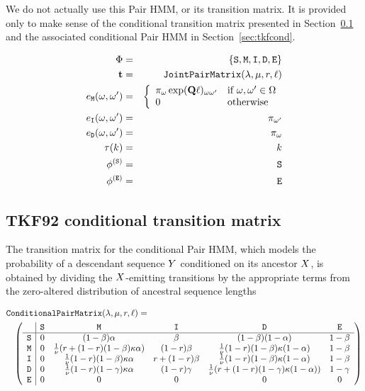 \documentclass{article}
\newcommand\seclabel[1]{\label{sec:#1}}
\newcommand\secref[1]{Section~\ref{sec:#1}}
\begin{document}
We do not actually use this Pair HMM, or its transition matrix.
It is provided only to make sense of the conditional transition matrix presented in
\secref{tkfcondmatrix} and the associated conditional Pair HMM in \secref{tkfcond}.

\begin{eqnarray*}
   \Phi & = & \{ {\tt S}, {\tt M}, {\tt I}, {\tt D}, {\tt E} \} \\
   {\bf t} & = & {\tt JointPairMatrix}(\lambda,\mu,r,\ell) \\
   e_{\tt M}(\omega,\omega') & = &
   \left\{
   \begin{array}{ll}
   \pi_{\omega} \exp({\bf Q} \ell)_{\omega \omega'} & \mbox{if $\omega,\omega' \in \Omega$}
   \\ 0 & \mbox{otherwise}
   \end{array}
   \right. \\
   e_{\tt I}(\omega,\omega') & = & \pi_{\omega'} \\
   e_{\tt D}(\omega,\omega') & = & \pi_{\omega} \\
   \tau(k) & = & k \\
   \phi^{({\tt S})} & = & {\tt S} \\
   \phi^{({\tt E})} & = & {\tt E}
\end{eqnarray*}


\subsection{TKF92 conditional transition matrix}
\seclabel{tkfcondmatrix}

The transition matrix for the conditional Pair HMM, which models the probability
of a descendant sequence $Y$ conditioned on its ancestor $X$, is obtained by dividing the
$X$-emitting transitions by the appropriate terms from the zero-altered distribution of
ancestral sequence lengths

\begin{eqnarray*}
\lefteqn{\conditionalpairmatrix(\insrate,\delrate,\fragext,\ell) =} & & \\
& & \left( \begin{array}{r|ccccc}
   & \sta & \mat & \ins & \del & \fin \\
\hline
\sta & 0 & (1-\beta)\alpha & \beta & (1-\beta)(1-\alpha) & 1-\beta \\
\mat & 0 & \frac{1}{\nu}(\fragext + (1-\fragext)(1-\beta)\kappa\alpha) & (1-\fragext)\beta & \frac{1}{\nu}(1-\fragext)(1-\beta)\kappa(1-\alpha) & 1-\beta \\
\ins & 0 & \frac{1}{\nu}(1-\fragext)(1-\beta)\kappa\alpha & \fragext + (1-\fragext)\beta & \frac{1}{\nu}(1-\fragext)(1-\beta)\kappa(1-\alpha) & 1-\beta \\
\del & 0 & \frac{1}{\nu}(1-\fragext)(1-\gamma)\kappa\alpha & (1-\fragext)\gamma & \frac{1}{\nu}(\fragext + (1-\fragext)(1-\gamma)\kappa(1-\alpha)) & 1-\gamma \\
\fin & 0 & 0 & 0 & 0 & 0
   \end{array} \right)
\end{eqnarray*}
\end{document}
